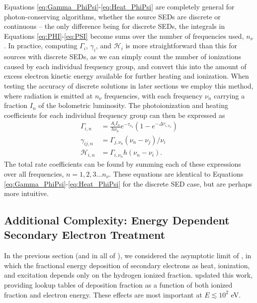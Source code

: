 \documentclass[letterpaper,titlepage,12pt]{article}
\numberwithin{equation}{section}
\newcommand{\Heat}{\mathcal{H}}
\begin{document}
Equations \ref{eq:Gamma_PhiPsi}-\ref{eq:Heat_PhiPsi} are completely general
for photon-conserving algorithms, whether the source SEDs are discrete or
continuous -- the only difference being for discrete SEDs, the integrals in
Equations \ref{eq:PHI}-\ref{eq:PSI} become sums over the number of frequencies
used, $n_{\nu}$. In practice, computing $\Gamma_i$, $\gamma_i$, and $\Heat_i$
is more straightforward than this for sources with discrete SEDs, as we can
simply count the number of ionizations caused by each individual frequency
group, and convert this into the amount of excess electron kinetic energy
available for further heating and ionization. When testing the accuracy of
discrete solutions in later sections we employ this method, where radiation is
emitted at $n_{\nu}$ frequencies, with each frequency $\nu_n$ carrying a
fraction $I_n$ of the bolometric luminosity. The photoionization and heating
coefficients for each individual frequency group can then be expressed as
\begin{align}
    \Gamma_{i,n} & = \frac{A_i I_n}{h \nu_n} e^{-\tau_{\nu_n}}(1 - e^{-\Delta \tau_{i,\nu_n}}) \label{eq:Gamma_simple}\\
    \gamma_{ij,n} & = \Gamma_{j,\nu_n} (\nu_n-\nu_j) / \nu_i \label{eq:gamma_simple} \\
    \Heat_{i,n} & = \Gamma_{i,\nu_n} h(\nu_n - \nu_i) \label{eq:Heat_simple}.
\end{align}    
The total rate coefficients can be found by summing each of these expressions
over all frequencies, $n=1,2,3...n_{\nu}$. These equations are identical to
Equations \ref{eq:Gamma_PhiPsi}-\ref{eq:Heat_PhiPsi} for the discrete SED
case, but are perhaps more intuitive.

\subsection{Additional Complexity: Energy Dependent Secondary Electron Treatment}
In the previous section (and in all of \citet{Mirocha2012}), we considered the asymptotic limit of \citet{Shull1985}, in which the fractional energy deposition of secondary electrons as heat, ionization, and excitation depends only on the hydrogen ionized fraction.  \citet{Furlanetto2010} updated this work, providing lookup tables of deposition fraction as a function of both ionized fraction and electron energy.  These effects are most important at $E \lesssim 10^2$ eV.  
\end{document}
